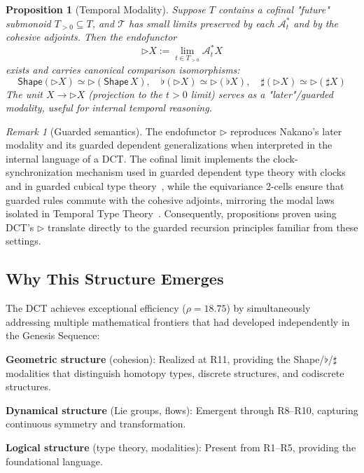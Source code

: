 \documentclass[11pt]{article}
\theoremstyle{definition}
\theoremstyle{plain}
\newtheorem{proposition}{Proposition}
\theoremstyle{remark}
\newtheorem{remark}{Remark}
\begin{document}
\begin{proposition}[Temporal Modality]\label{prop:temporal}
Suppose $T$ contains a cofinal "future" submonoid $T_{>0} \subseteq T$, and $\mathcal{T}$ has small limits preserved by each $\mathcal{A}^*_t$ and by the cohesive adjoints. Then the endofunctor
\[
\triangleright X := \lim_{t \in T_{>0}} \mathcal{A}^*_t X
\]
exists and carries canonical comparison isomorphisms:
\[
\mathsf{Shape}(\triangleright X) \simeq \triangleright(\mathsf{Shape}\, X), \quad \flat(\triangleright X) \simeq \triangleright(\flat X), \quad \sharp(\triangleright X) \simeq \triangleright(\sharp X)
\]
The unit $X \to \triangleright X$ (projection to the $t > 0$ limit) serves as a "later"/guarded modality, useful for internal temporal reasoning.
\end{proposition}

\begin{remark}[Guarded semantics]
The endofunctor $\triangleright$ reproduces Nakano's later modality and its guarded dependent generalizations when interpreted in the internal language of a DCT. The cofinal limit implements the clock-synchronization mechanism used in guarded dependent type theory with clocks~\cite{guarded-dependent} and in guarded cubical type theory~\cite{guarded-cubical}, while the equivariance 2-cells ensure that guarded rules commute with the cohesive adjoints, mirroring the modal laws isolated in Temporal Type Theory~\cite{schultz-spivak-temporal}. Consequently, propositions proven using DCT's $\triangleright$ translate directly to the guarded recursion principles familiar from these settings.
\end{remark}

\subsection{Why This Structure Emerges}

The DCT achieves exceptional efficiency ($\rho = 18.75$) by simultaneously addressing multiple mathematical frontiers that had developed independently in the Genesis Sequence:

\textbf{Geometric structure} (cohesion): Realized at R11, providing the Shape/$\flat$/$\sharp$ modalities that distinguish homotopy types, discrete structures, and codiscrete structures.

\textbf{Dynamical structure} (Lie groups, flows): Emergent through R8--R10, capturing continuous symmetry and transformation.

\textbf{Logical structure} (type theory, modalities): Present from R1--R5, providing the foundational language.
\end{document}
